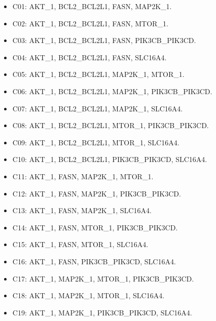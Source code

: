 \begin{itemize}

\item C01: AKT\_1, BCL2\_BCL2L1, FASN, MAP2K\_1.

\item C02: AKT\_1, BCL2\_BCL2L1, FASN, MTOR\_1.

\item C03: AKT\_1, BCL2\_BCL2L1, FASN, PIK3CB\_PIK3CD.

\item C04: AKT\_1, BCL2\_BCL2L1, FASN, SLC16A4.

\item C05: AKT\_1, BCL2\_BCL2L1, MAP2K\_1, MTOR\_1.

\item C06: AKT\_1, BCL2\_BCL2L1, MAP2K\_1, PIK3CB\_PIK3CD.

\item C07: AKT\_1, BCL2\_BCL2L1, MAP2K\_1, SLC16A4.

\item C08: AKT\_1, BCL2\_BCL2L1, MTOR\_1, PIK3CB\_PIK3CD.

\item C09: AKT\_1, BCL2\_BCL2L1, MTOR\_1, SLC16A4.

\item C10: AKT\_1, BCL2\_BCL2L1, PIK3CB\_PIK3CD, SLC16A4.

\item C11: AKT\_1, FASN, MAP2K\_1, MTOR\_1.

\item C12: AKT\_1, FASN, MAP2K\_1, PIK3CB\_PIK3CD.

\item C13: AKT\_1, FASN, MAP2K\_1, SLC16A4.

\item C14: AKT\_1, FASN, MTOR\_1, PIK3CB\_PIK3CD.

\item C15: AKT\_1, FASN, MTOR\_1, SLC16A4.

\item C16: AKT\_1, FASN, PIK3CB\_PIK3CD, SLC16A4.

\item C17: AKT\_1, MAP2K\_1, MTOR\_1, PIK3CB\_PIK3CD.

\item C18: AKT\_1, MAP2K\_1, MTOR\_1, SLC16A4.

\item C19: AKT\_1, MAP2K\_1, PIK3CB\_PIK3CD, SLC16A4.


\end{itemize}
